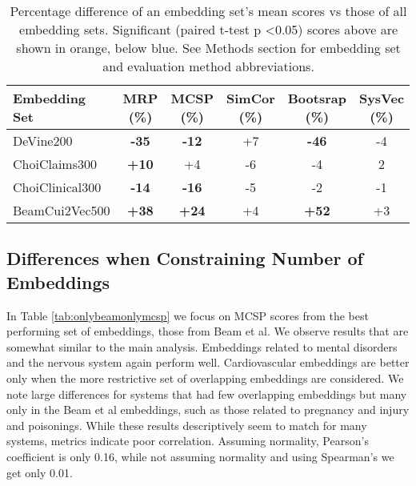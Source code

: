 \documentclass[11pt,a4paper]{article}
\def\blu#1{{\textbf{\color{blu}#1}}}
\def\ora#1{{\textbf{\color{ora}#1}}}
\begin{document}
\begin{table*}[h]
	\begin{center}
	
	\label{tab:allembedresults}
	\begin{tabular}{l|c|c|c|c|c}
			            Embedding Set &MRP (\%)	        &MCSP (\%)	           &SimCor (\%)	    &Bootsrap (\%)	  &SysVec (\%)\\
			            \hline
		DeVine200       &\blu{-35}   &\blu{-12}	   &+7	    &\blu{-46} &	-4 \\
		ChoiClaims300   &\ora{+10}	& +4	           &-6	    &-4	      &2   \\
		ChoiClinical300	&\blu{-14}	&\blu{-16}	   &-5	    &-2	      &-1  \\
		BeamCui2Vec500	&\ora{+38}	&\ora{+24}	       &+4       &\ora{+52}  &+3   \\
	\end{tabular}
\caption{Percentage difference of an embedding set's mean scores vs those of all embedding sets. Significant (paired t-test p \textless 0.05) scores above are shown in orange, below blue. See Methods section for embedding set and evaluation method abbreviations.}
\end{center}
\end{table*}

\subsection{Differences when Constraining Number of Embeddings}

In Table \ref{tab:onlybeamonlymcsp} we focus on MCSP scores from the best performing set of embeddings, those from Beam et al. We observe results that are somewhat similar to the main  analysis. Embeddings related to mental disorders and the nervous system again perform well. Cardiovascular embeddings are better only when the more restrictive set of overlapping embeddings are considered. We note large differences for systems that had few overlapping embeddings but many only in the Beam et al embeddings, such as those related to pregnancy and injury and poisonings.  While these results descriptively seem to match for many systems, metrics indicate poor correlation. Assuming normality, Pearson's coefficient is only 0.16, while not assuming normality and using Spearman's we get only 0.01. 
\end{document}

